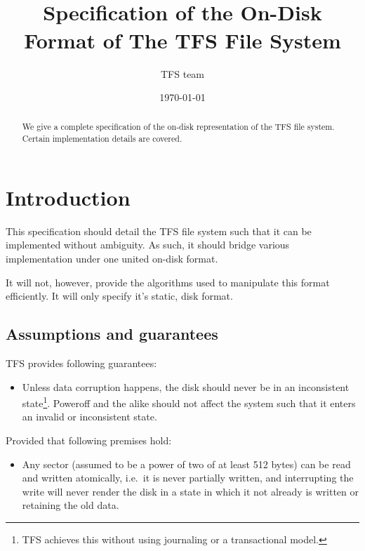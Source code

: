 \documentclass[11pt,a4paper]{report}
\title{
    \centering{}\\
    Specification of the On-Disk Format of The TFS File System
}
\author{TFS team}
\date{\today}
\newcommand{\minimumsectorsize}{512 }
\begin{document}
    \begin{abstract}
        We give a complete specification of the on-disk representation of the
        TFS file system. Certain implementation details are covered.
    \end{abstract}

    \maketitle
    \tableofcontents

    \chapter{Introduction}
    This specification should detail the TFS file system such that it can be
    implemented without ambiguity. As such, it should bridge various
    implementation under one united on-disk format.

    It will not, however, provide the algorithms used to manipulate this format
    efficiently. It will only specify it's static, disk format.

    \section{Assumptions and guarantees}
    \label{assumptions_guarantees}
        TFS provides following guarantees:

        \begin{itemize}
            \item Unless data corruption happens, the disk should never be in
                an inconsistent state\footnote{TFS achieves this without using
                journaling or a transactional model.}. Poweroff and the alike
                should not affect the system such that it enters an invalid or
                inconsistent state.
        \end{itemize}

        Provided that following premises hold:

        \begin{itemize}
            \item Any sector (assumed to be a power of two of at least
                \minimumsectorsize bytes) can be read and written atomically,
                i.e.\ it is never partially written, and interrupting the write
                will never render the disk in a state in which it not already
                is written or retaining the old data.
        \end{itemize}
\end{document}
